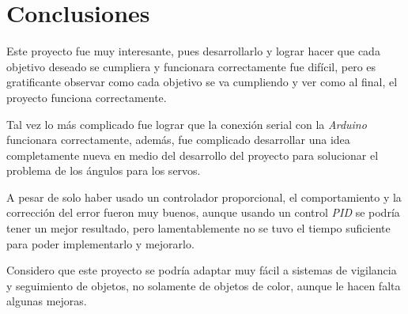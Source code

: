 \documentclass[12pt, oneside]{article}
\begin{document}
\section{Conclusiones}
{\sffamily\large\justify
    \hspace{0.5cm} Este proyecto fue muy interesante, pues desarrollarlo y lograr hacer
    que cada objetivo deseado se cumpliera y funcionara correctamente fue difícil, pero
    es gratificante observar como cada objetivo se va cumpliendo y ver como al final, el
    proyecto funciona correctamente.

    \hspace{0.5cm} Tal vez lo más complicado fue lograr que la conexión serial con la
    \emph{Arduino} funcionara correctamente, además, fue complicado desarrollar una idea
    completamente nueva en medio del desarrollo del proyecto para solucionar el problema
    de los ángulos para los servos.

    \hspace{0.5cm} A pesar de solo haber usado un controlador proporcional, el
    comportamiento y la corrección del error fueron muy buenos, aunque usando un control
    \emph{PID} se podría tener un mejor resultado, pero lamentablemente no se tuvo el
    tiempo suficiente para poder implementarlo y mejorarlo.

    \hspace{0.5cm} Considero que este proyecto se podría adaptar muy fácil a sistemas de
    vigilancia y seguimiento de objetos, no solamente de objetos de color, aunque le
    hacen falta algunas mejoras.

}
\end{document}
